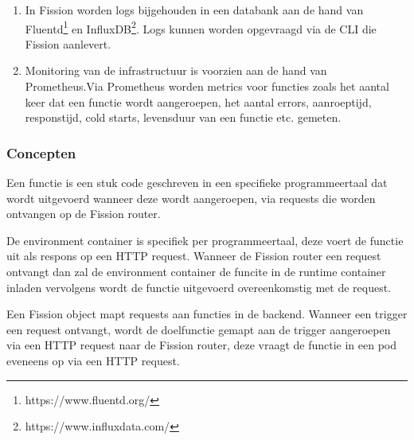 \begin{enumerate}
    \item In Fission worden logs bijgehouden in een databank aan de hand van Fluentd\footnote{https://www.fluentd.org/} en InfluxDB\footnote{https://www.influxdata.com/}. Logs kunnen worden opgevraagd via de CLI die Fission aanlevert.
    \item Monitoring van de infrastructuur is voorzien aan de hand van Prometheus.Via Prometheus worden metrics voor functies zoals het aantal keer dat een functie wordt aangeroepen, het aantal errors, aanroeptijd, responstijd, cold starts, levensduur van een functie etc. gemeten.
\end{enumerate}

\subsubsection{Concepten}
\begin{description}[style=unboxed, labelwidth=\linewidth, listparindent =0pt]
    \item[Functie]
    Een functie is een stuk code geschreven in een specifieke programmeertaal dat wordt uitgevoerd wanneer deze wordt aangeroepen, via requests die worden ontvangen op de Fission router. \autocite{Fission2018}
    \newline
    
    \item[Environment]
    De environment container is specifiek per programmeertaal, deze voert de functie uit als respons op een HTTP request. Wanneer de Fission router een request ontvangt dan zal de environment container de funcite in de runtime container inladen vervolgens wordt de functie uitgevoerd overeenkomstig met de request. \autocite{Fission2018}
    \newline
    
    \item[Trigger]
    Een Fission object mapt requests aan functies in de backend. Wanneer een trigger een request ontvangt, wordt de doelfunctie gemapt aan de trigger aangeroepen via een HTTP request naar de Fission router, deze vraagt de functie in een pod eveneens op via een HTTP request. \autocite{Fission2018}
    \newline
\end{description}


